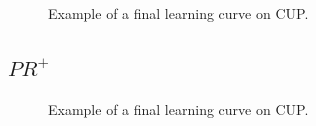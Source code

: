 \begin{appendices}
                \begin{figure}[H]
                    \centering
                        \label{fig:cup_hs}
                    \caption{Example of a final learning curve on CUP.}
                \end{figure}

            \subsection{$PR^+$}
            \label{sec:cup_pr}

                \begin{figure}[H]
                    \centering
                        \label{fig:cup_pr}
                    \caption{Example of a final learning curve on CUP.}
                \end{figure}

\end{appendices}
